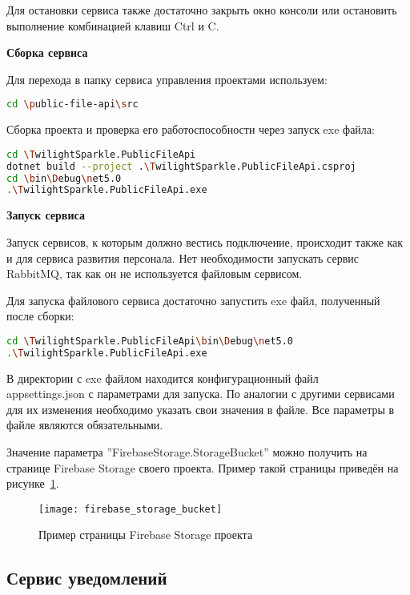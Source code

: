 Для остановки сервиса также достаточно закрыть окно консоли или остановить выполнение комбинацией клавиш Ctrl и C.

\bigskip
\textbf{Сборка сервиса}

Для перехода в папку сервиса управления проектами используем:

\begin{lstlisting}[language=bash]
cd \public-file-api\src
\end{lstlisting}

Сборка проекта и проверка его работоспособности через запуск exe файла:

\begin{lstlisting}[language=bash]
cd \TwilightSparkle.PublicFileApi
dotnet build --project .\TwilightSparkle.PublicFileApi.csproj
cd \bin\Debug\net5.0
.\TwilightSparkle.PublicFileApi.exe
\end{lstlisting}

\bigskip
\textbf{Запуск сервиса}

Запуск сервисов, к которым должно вестись подключение, происходит также как и для сервиса развития персонала. Нет необходимости запускать сервис RabbitMQ, так как он не используется файловым сервисом.

Для запуска файлового сервиса достаточно запустить exe файл, полученный после сборки:

\begin{lstlisting}[language=bash]
cd \TwilightSparkle.PublicFileApi\bin\Debug\net5.0
.\TwilightSparkle.PublicFileApi.exe
\end{lstlisting}

В директории с exe файлом находится конфигурационный файл \\appsettings.json с параметрами для запуска. По аналогии с другими сервисами для их изменения необходимо указать свои значения в файле. Все параметры в файле являются обязательными.

Значение параметра ''FirebaseStorage.StorageBucket'' можно получить на странице Firebase Storage своего проекта. Пример такой страницы приведён на рисунке~\ref{fig:firebase_storage_bucket}.

\begin{figure}[ht]
    \centering
    \texttt{[image: firebase\_storage\_bucket]}
    \caption{Пример страницы Firebase Storage проекта}\label{fig:firebase_storage_bucket}
\end{figure}


\subsection{Сервис уведомлений}

